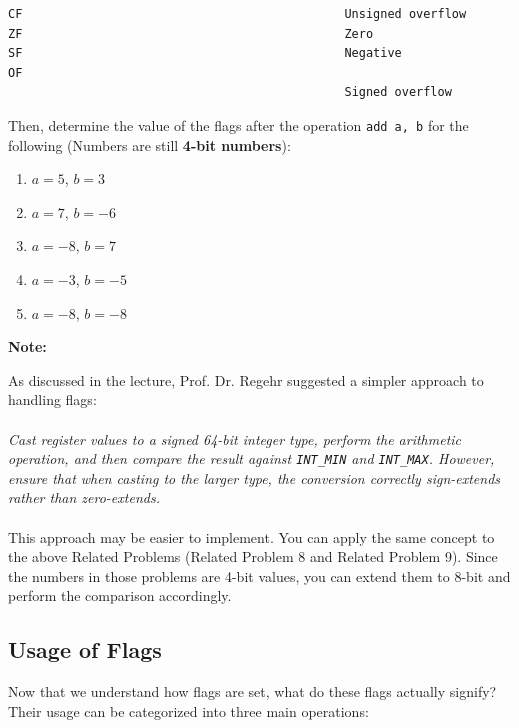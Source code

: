\documentclass{article}
\begin{document}
\begin{Verbatim}[frame=single]
CF                                             Unsigned overflow
ZF                                             Zero
SF                                             Negative
OF   
                                               Signed overflow
\end{Verbatim}

Then, determine the value of the flags after the operation \texttt{add a, b} for the following (Numbers are still \textbf{4-bit numbers}): \\
\begin{enumerate}
    \item $a = 5$, $b = 3$
    \item $a = 7$, $b = -6$
    \item $a = -8$, $b = 7$
    \item $a = -3$, $b = -5$
    \item $a = -8$, $b = -8$
\end{enumerate}

\noindent\textbf{Note:}  

As discussed in the lecture, Prof. Dr. Regehr suggested a simpler approach to handling flags: \\
\\
\textit{Cast register values to a signed 64-bit integer type, perform the arithmetic operation, and then compare the result against \texttt{INT\_MIN} and \texttt{INT\_MAX}. However, ensure that when casting to the larger type, the conversion correctly sign-extends rather than zero-extends.} \\
\\
This approach may be easier to implement. You can apply the same concept to the above Related Problems (Related Problem 8 and Related Problem 9). Since the numbers in those problems are 4-bit values, you can extend them to 8-bit and perform the comparison accordingly.

\clearpage
\subsection{Usage of Flags}

Now that we understand how flags are set, what do these flags actually signify? Their usage can be categorized into three main operations:
\end{document}
